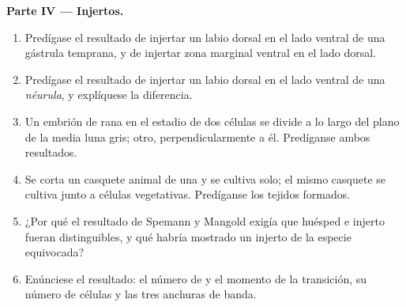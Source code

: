 \begin{problem}
\medskip
\noindent\textbf{Parte IV --- Injertos.}
\begin{enumerate}[resume]
  \item Predígase el resultado de injertar un labio dorsal en el lado
        ventral de una gástrula temprana, y de injertar zona marginal
        ventral en el lado dorsal.
  \item Predígase el resultado de injertar un labio dorsal en el lado
        ventral de una \emph{néurula}, y explíquese la diferencia.
  \item Un embrión de rana en el estadio de dos células se divide a lo
        largo del plano de la media luna gris; otro, perpendicularmente a
        él. Predíganse ambos resultados.
  \item Se corta un casquete animal de una  y se cultiva solo; el
        mismo casquete se cultiva junto a células vegetativas. Predíganse
        los tejidos formados.
  \item ¿Por qué el resultado de Spemann y Mangold exigía que huésped e
        injerto fueran distinguibles, y qué habría mostrado un injerto de
        la especie equivocada?
  \item Enúnciese el resultado: el número de  y el momento de
        la transición, su número de células y las tres anchuras de banda.
\end{enumerate}
\end{problem}
